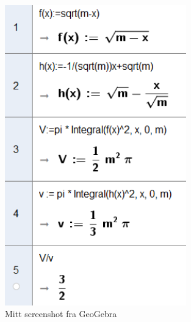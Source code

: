 \documentclass{article}
\begin{document}
\begin{figure}[h] %
    \centering
    \includegraphics[width=0.7\textwidth]{oppgave12.png}
    \caption{Mitt screenshot fra GeoGebra}
    \label{fig:geogebra}
\end{figure}
\end{document}

